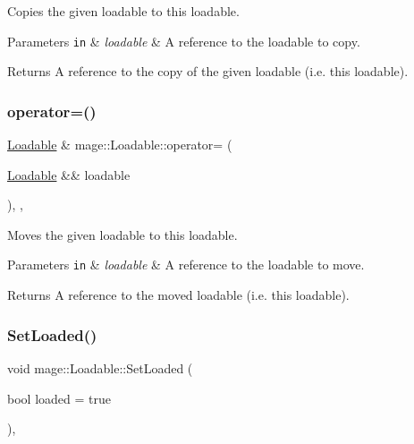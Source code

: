 Copies the given loadable to this loadable.


\begin{DoxyParams}[1]{Parameters}
\mbox{\tt in}  & {\em loadable} & A reference to the loadable to copy. \\
\hline
\end{DoxyParams}
\begin{DoxyReturn}{Returns}
A reference to the copy of the given loadable (i.\+e. this loadable). 
\end{DoxyReturn}
\hypertarget{classmage_1_1_loadable_a553b6c96536fc6d8c38fdf766bf55402}{}\label{classmage_1_1_loadable_a553b6c96536fc6d8c38fdf766bf55402} 
\subsubsection{\texorpdfstring{operator=()}{operator=()}\hspace{0.1cm}{\footnotesize\ttfamily [2/2]}}
{\footnotesize\ttfamily \hyperlink{classmage_1_1_loadable}{Loadable} \& mage\+::\+Loadable\+::operator= (\begin{DoxyParamCaption}\item[{\hyperlink{classmage_1_1_loadable}{Loadable} \&\&}]{loadable }\end{DoxyParamCaption})\hspace{0.3cm}{\ttfamily [protected]}, {\ttfamily [default]}, {\ttfamily [noexcept]}}

Moves the given loadable to this loadable.


\begin{DoxyParams}[1]{Parameters}
\mbox{\tt in}  & {\em loadable} & A reference to the loadable to move. \\
\hline
\end{DoxyParams}
\begin{DoxyReturn}{Returns}
A reference to the moved loadable (i.\+e. this loadable). 
\end{DoxyReturn}
\hypertarget{classmage_1_1_loadable_adb8689c0dfc46138ac72768da897dc8f}{}\label{classmage_1_1_loadable_adb8689c0dfc46138ac72768da897dc8f} 
\subsubsection{\texorpdfstring{Set\+Loaded()}{SetLoaded()}}
{\footnotesize\ttfamily void mage\+::\+Loadable\+::\+Set\+Loaded (\begin{DoxyParamCaption}\item[{bool}]{loaded = {\ttfamily true} }\end{DoxyParamCaption})\hspace{0.3cm}{\ttfamily [protected]}, {\ttfamily [noexcept]}}

